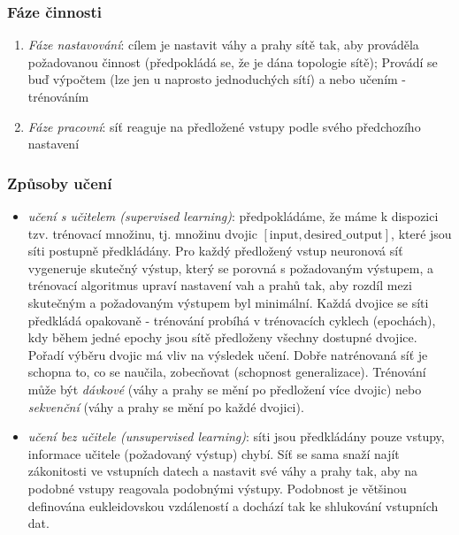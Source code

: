 \subsubsection*{Fáze činnosti}
\begin{enumerate}
\item \textit{Fáze nastavování}: cílem je nastavit váhy a prahy sítě tak, aby prováděla požadovanou činnost (předpokládá se, že je dána topologie sítě); Provádí se buď výpočtem (lze jen u naprosto jednoduchých sítí) a nebo učením - trénováním
\item \textit{Fáze pracovní}: síť reaguje na předložené vstupy podle svého předchozího nastavení
\end{enumerate}

\subsubsection*{Způsoby učení}
\begin{itemize}
\item \textit{učení s učitelem (supervised learning)}: předpokládáme, že máme k dispozici tzv. trénovací množinu, tj. množinu dvojic $ \mathrm{[input, desired\_output]} $, které jsou síti postupně předkládány. Pro každý předložený vstup neuronová síť vygeneruje skutečný výstup, který se porovná s požadovaným výstupem, a trénovací algoritmus upraví nastavení vah a prahů tak, aby rozdíl mezi skutečným a požadovaným výstupem byl minimální. Každá dvojice se síti předkládá opakovaně - trénování probíhá v trénovacích cyklech (epochách), kdy během jedné epochy jsou sítě předloženy všechny dostupné dvojice. Pořadí výběru dvojic má vliv na výsledek učení. Dobře natrénovaná síť je schopna to, co se naučila, zobecňovat (schopnost generalizace). Trénování může být \textit{dávkové} (váhy a prahy se mění po předložení více dvojic) nebo \textit{sekvenční} (váhy a prahy se mění po každé dvojici).
\item \textit{učení bez učitele (unsupervised learning)}: síti jsou předkládány pouze vstupy, informace učitele (požadovaný výstup) chybí. Síť se sama snaží najít zákonitosti ve vstupních datech a nastavit své váhy a prahy tak, aby na podobné vstupy reagovala podobnými výstupy. Podobnost je většinou definována eukleidovskou vzdáleností a dochází tak ke shlukování vstupních dat.
\end{itemize}

